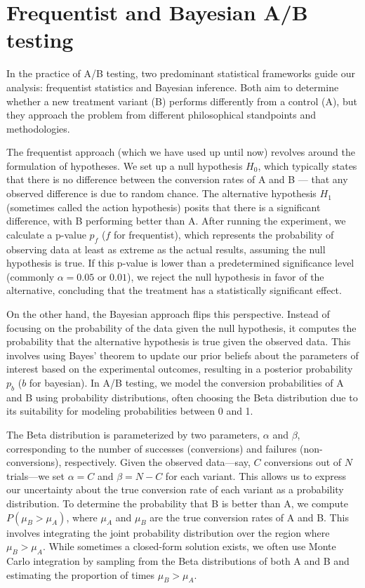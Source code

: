 \documentclass[final,5p,times,twocolumn,authoryear]{elsarticle}
\begin{document}
\section{Frequentist and Bayesian A/B testing}

In the practice of A/B testing, two predominant statistical frameworks guide our analysis: frequentist statistics and Bayesian inference. Both aim to determine whether a new treatment variant (B) performs differently from a control (A), but they approach the problem from different philosophical standpoints and methodologies.

The frequentist approach (which we have used up until now) revolves around the formulation of hypotheses. We set up a null hypothesis $ H_0 $, which typically states that there is no difference between the conversion rates of A and B — that any observed difference is due to random chance. The alternative hypothesis $ H_1 $ (sometimes called the action hypothesis) posits that there is a significant difference, with B performing better than A. After running the experiment, we calculate a p-value $ p_f $ ($f$ for frequentist), which represents the probability of observing data at least as extreme as the actual results, assuming the null hypothesis is true. If this p-value is lower than a predetermined significance level (commonly $ \alpha = 0.05 $ or $ 0.01 $), we reject the null hypothesis in favor of the alternative, concluding that the treatment has a statistically significant effect.

On the other hand, the Bayesian approach flips this perspective. Instead of focusing on the probability of the data given the null hypothesis, it computes the probability that the alternative hypothesis is true given the observed data. This involves using Bayes' theorem to update our prior beliefs about the parameters of interest based on the experimental outcomes, resulting in a posterior probability $ p_b $ ($b$ for bayesian). In A/B testing, we model the conversion probabilities of A and B using probability distributions, often choosing the Beta distribution due to its suitability for modeling probabilities between 0 and 1.

The Beta distribution is parameterized by two parameters, $ \alpha $ and $ \beta $, corresponding to the number of successes (conversions) and failures (non-conversions), respectively. Given the observed data—say, $ C $ conversions out of $ N $ trials—we set $ \alpha = C $ and $ \beta = N - C $ for each variant. This allows us to express our uncertainty about the true conversion rate of each variant as a probability distribution. To determine the probability that B is better than A, we compute $ P(\mu_B > \mu_A) $, where $ \mu_A $ and $ \mu_B $ are the true conversion rates of A and B. This involves integrating the joint probability distribution over the region where $ \mu_B > \mu_A $. While sometimes a closed-form solution exists, we often use Monte Carlo integration by sampling from the Beta distributions of both A and B and estimating the proportion of times $ \mu_B > \mu_A $.
\end{document}
